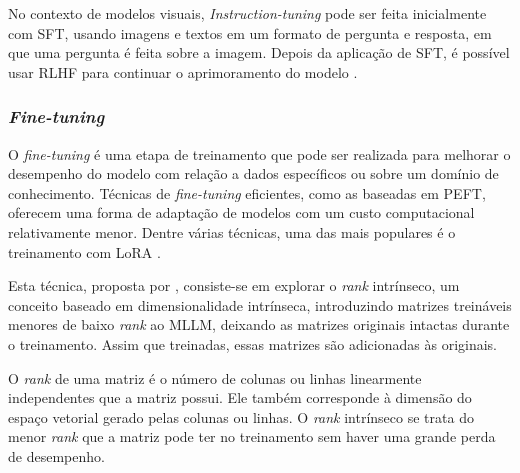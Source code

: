 No contexto de modelos visuais, \textit{Instruction-tuning} pode ser feita inicialmente com \ac{SFT}, usando imagens e
textos em um formato de pergunta e resposta, em que uma pergunta é feita sobre a imagem. Depois da aplicação de
\ac{SFT}, é possível usar \ac{RLHF} para continuar o aprimoramento do modelo \cite{mllm_survey_2024}.

\subsubsection{\textit{Fine-tuning}}

O \textit{fine-tuning} é uma etapa de treinamento que pode ser realizada para melhorar o desempenho do modelo com
relação a dados específicos ou sobre um domínio de conhecimento. Técnicas de \textit{fine-tuning} eficientes, como as
baseadas em \ac{PEFT}, oferecem uma forma de adaptação de modelos com um custo computacional relativamente menor. Dentre
várias técnicas, uma das mais populares é o treinamento com \ac{LoRA} \cite{llm_survey_2023}.


Esta técnica, proposta por \textcite{hu2021lora}, consiste-se em explorar o \textit{rank} intrínseco, um conceito
baseado em dimensionalidade intrínseca, introduzindo matrizes treináveis menores de baixo \textit{rank} ao \ac{MLLM},
deixando as matrizes originais intactas durante o treinamento. Assim que treinadas, essas matrizes são adicionadas às
originais.

O \textit{rank} de uma matriz é o número de colunas ou linhas linearmente independentes que a matriz possui. Ele também
corresponde à dimensão do espaço vetorial gerado pelas colunas ou linhas. O \textit{rank} intrínseco se trata do menor
\textit{rank} que a matriz pode ter no treinamento sem haver uma grande perda de desempenho.

